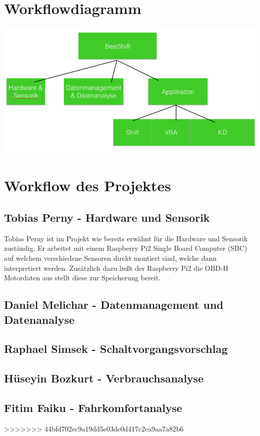 \section{Workflowdiagramm}
\includegraphics[scale=0.5]{images/Workflowdiagramm.png}

\newline
\section{Workflow des Projektes}
	\subsection{Tobias Perny - Hardware und Sensorik}
	Tobias Perny ist im Projekt wie bereits erwähnt für die Hardware und Sensorik zuständig. Er arbeitet mit einem Raspberry Pi2 Single Board Computer (SBC) auf welchem verschiedene Sensoren direkt montiert sind, welche dann interpretiert werden. Zusätzlich dazu ließt der Raspberry Pi2 die OBD-II Motordaten aus stellt diese zur Speicherung bereit.

	\subsection{Daniel Melichar - Datenmanagement und Datenanalyse}

	\subsection{Raphael Simsek - Schaltvorgangsvorschlag}

	\subsection{Hüseyin Bozkurt - Verbrauchsanalyse}

	\subsection{Fitim Faiku - Fahrkomfortanalyse}

>>>>>>> 44bfd702ec9a19dd5e03de0d417c2ea9aa7a82b6
